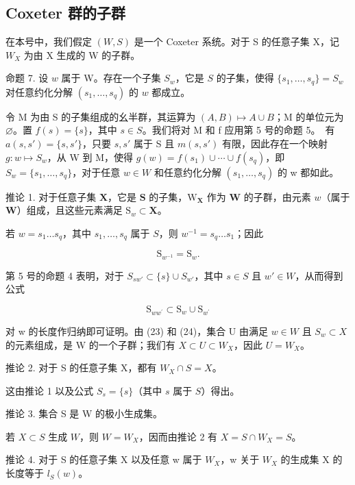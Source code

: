 \subsection{Coxeter 群的子群}

在本号中，我们假定 \((W, S)\) 是一个 Coxeter 系统。对于 S 的任意子集 X，记 \(W_{X}\) 为由 X 生成的 W 的子群。

命题 7. 设 \(w\) 属于 W。存在一个子集 \(S_w\)，它是 \(S\) 的子集，使得 \(\{s_1, \ldots, s_q\} = S_w\) 对任意约化分解 \((s_1, \ldots, s_q)\) 的 \(w\) 都成立。

令 M 为由 S 的子集组成的幺半群，其运算为 \((A,B)\mapsto A\cup B\)；M 的单位元为 \(\varnothing\)。置 \(f(s)=\{s\}\)，其中 \(s\in S\)。我们将对 M 和 f 应用第 5 号的命题 5。~有 \(a(s,s')=\{s,s'\}\)，只要 \(s,s'\) 属于 S 且 \(m(s,s')\) 有限，因此存在一个映射 \(g:w\mapsto S_w\)，从 W 到 M，使得 \(g(w)=f(s_1)\cup\cdots\cup f(s_q)\)，即 \(S_w=\{s_1,\ldots,s_q\}\)，对于任意 \(w\in W\) 和任意约化分解 \((s_1,\ldots,s_q)\) 的 w 都如此。

推论 1. 对于任意子集 \(\mathbf{X}\)，它是 \(\mathbf{S}\) 的子集，\(\mathrm{W}_{\mathbf{X}}\) 作为 \(\mathbf{W}\) 的子群，由元素 \(w\)（属于 \(\mathbf{W}\)）组成，且这些元素满足 \(\mathrm{S}_w \subset \mathbf{X}\)。

若 \(w = s_1 \ldots s_q\)，其中 \(s_1, \ldots, s_q\) 属于 \(S\)，则 \(w^{-1} = s_q \ldots s_1\)；因此

\[
\mathrm{S} _ {w ^ {- 1}} = \mathrm{S} _ {w}.\tag{23}
\]

第 5 号的命题 4 表明，对于 \(S_{sw'} \subset \{s\} \cup S_{w'}\)，其中 \(s \in S\) 且 \(w' \in W\)，从而得到公式

\[
\mathrm{S} _ {w w ^ {\prime}} \subset \mathrm{S} _ {w} \cup \mathrm{S} _ {w ^ {\prime}}\tag{24}
\]

对 w 的长度作归纳即可证明。由 (23) 和 (24)，集合 U 由满足 \(w \in W\) 且 \(S_{w} \subset X\) 的元素组成，是 W 的一个子群；我们有 \(X \subset U \subset W_{X}\)，因此 \(U = W_{X}\)。

推论 2. 对于 S 的任意子集 X，都有 \(W_{X} \cap S = X\)。

这由推论 1 以及公式 \(S_s = \{s\}\)（其中 \(s\) 属于 \(S\)）得出。

推论 3. 集合 S 是 W 的极小生成集。

若 \(X \subset S\) 生成 \(W\)，则 \(W = W_X\)，因而由推论 2 有 \(X = S \cap W_X = S\)。

推论 4. 对于 S 的任意子集 X 以及任意 w 属于 \(W_{X}\)，w 关于 \(W_{X}\) 的生成集 X 的长度等于 \(l_{S}(w)\)。

